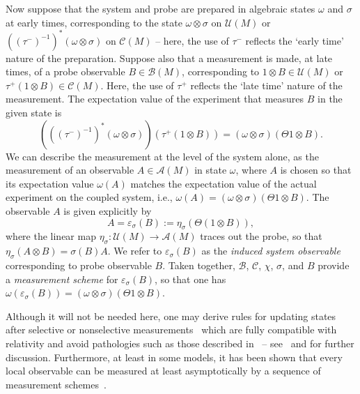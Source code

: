 \documentclass[sn-mathphys-num]{sn-jnl}%
\newcommand{\Af}{\mathscr{A}}
\newcommand{\Bf}{\mathscr{B}}
\newcommand{\Cf}{\mathscr{C}}
\newcommand{\Uf}{\mathscr{U}}
\numberwithin{equation}{section}
\theoremstyle{thmstyleone}%
\theoremstyle{thmstyletwo}%
\theoremstyle{thmstylethree}%
\begin{document}
Now suppose that the system and probe are prepared in algebraic states $\omega$ and $\sigma$ at early times, corresponding to the state $\omega\otimes\sigma$ on $\Uf(M)$ or $((\tau^-)^{-1})^*(\omega\otimes\sigma)$ on $\Cf(M)$ -- here, the use of $\tau^-$ reflects the `early time' nature of the preparation. Suppose also that a measurement is made, at late times, of a probe observable $B\in\Bf(M)$, corresponding to $1\otimes B\in \Uf(M)$ or $\tau^+(1\otimes B)\in\Cf(M)$. Here, the use of $\tau^+$ reflects the `late time' nature of the measurement. The expectation value of the experiment that measures $B$ in the given state is 
\begin{equation}
    (((\tau^-)^{-1})^*(\omega\otimes\sigma))(\tau^+(1\otimes B)) = 
    (\omega\otimes\sigma)(\Theta 1\otimes B).
\end{equation}
We can describe the measurement at the level of the system alone, as the measurement of an observable $A\in\Af(M)$ in state $\omega$, where $A$ is chosen so that its expectation value $\omega(A)$ matches the expectation value of the actual experiment on the coupled system, i.e., $\omega(A)=(\omega\otimes\sigma)(\Theta 1\otimes B)$. The observable $A$ is given explicitly by 
\begin{equation}\label{eq:induct}
    A = \varepsilon_\sigma(B):=\eta_\sigma (\Theta (1\otimes B)),
\end{equation}
where the linear map $\eta_\sigma:\Uf(M)\to\Af(M)$ traces out the probe, 
so that $\eta_\sigma (A\otimes B) =\sigma(B)A$. We refer to 
$\varepsilon_\sigma(B)$ as the \emph{induced system observable} corresponding to probe observable $B$. Taken together, $\Bf$, $\Cf$, $\chi$, $\sigma$, and $B$ provide a \emph{measurement scheme} for $\varepsilon_\sigma(B)$, so that one has $\omega(\varepsilon_\sigma(B))=(\omega\otimes\sigma)(\Theta 1\otimes B)$. 

Although it will not be needed here, one may derive rules for updating states after selective or nonselective measurements~\cite{FewVer_QFLM:2018} which are fully compatible with relativity and avoid pathologies such as those described in~\cite{sorkin1993impossible} -- see~\cite{BostelmannFewsterRuep:2020} and \cite{FewsterVerch_encyc:2023} for further discussion. Furthermore, at least in some models, it has been shown that every local observable can be measured at least asymptotically by a sequence of measurement schemes~\cite{FewsterJubbRuep:2022}.
\end{document}
